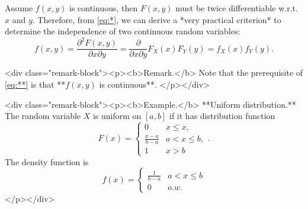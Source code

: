 Assume $f(x,y)$ is continuous, then $F(x,y)$ must be twice differentiable w.r.t. $x$ and $y$. Therefore, from \eqref{eq:*}, we can derive a *very practical criterion* to determine the independence of two continuous random variables:
$$$$\begin{equation}
    \label{eq:**}
    \tag{**}
    f(x,y) = \frac{\partial^2 F(x,y)}{\partial x \partial y} = \frac{\partial}{\partial x \partial y} F_X(x) F_Y(y) = f_X(x) f_Y(y).
\end{equation}$$$$

<div class="remark-block"><p><b>Remark.</b> 
Note that the prerequisite of \eqref{eq:**} is that **$f(x,y)$ is continuous**.
</p></div>

<div class="remark-block"><p><b>Example.</b> 
**Uniform distribution.** The random variable $X$ is uniform on $[a, b]$ if it has distribution function
$$\begin{equation}
    F(x) = \begin{cases} 
        0 & x \leq x, \\ \frac{x-a}{b-a} & a < x \leq b, \\ 1 & x > b
    \end{cases}.
\end{equation}$$
The density function is
$$\begin{equation}
    f(x) = \begin{cases} \frac{1}{b-a} & a < x \leq b \\ 0 & o.w. \end{cases}
\end{equation}$$
</p></div>

